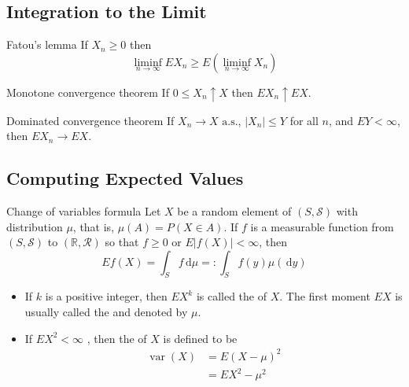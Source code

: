 \documentclass[../main.tex]{subfiles}
\begin{document}
\subsection{Integration to the Limit}
\begin{theorem}{Fatou's lemma}{}
If $X_n \ge 0$ then
\[
\liminf_{n\to\infty} E X_n \ge E\left(\liminf_{n\to\infty} X_n\right)
\]
\end{theorem}

\begin{theorem}{Monotone convergence theorem}{}
If $0 \le X_n \uparrow X$ then $EX_n \uparrow EX$.
\end{theorem}

\begin{theorem}{Dominated convergence theorem}{}
If $X_n \to X \text{ a.s.}$, $|X_n| \le Y$ for all $n$, and $EY < \infty$, then $EX_n \to EX$.
\end{theorem}

\subsection{Computing Expected Values}
\begin{theorem}{Change of variables formula}{}
Let $X$ be a random element of $(S, \mathcal{S})$ with distribution $\mu$, that is, $\mu(A) = P(X \in A)$. If $f$ is a measurable function from $(S, \mathcal{S})$ to $(\mathbb{R}, \mathcal{R})$ so that $f \geq 0$ or $E|f(X)| < \infty$, then
\[ Ef(X) = \int_S f \,\mathrm{d} \mu = : \int_{S}f\left( y \right)\mu \left( \,\mathrm{d} y \right)   \]
\end{theorem}



\begin{definition}{}{}
  \begin{itemize}
    \item If \(  k  \) is a positive integer, then \(  EX^{k}  \) is called the  of \(  X  \). The first moment \(  EX   \) is usually called the  and denoted by \(  \mu   \). 
    \item If \(  EX^{2}< \infty  \) , then the  of \(  X  \) is defined to be \[
    \begin{aligned}
    \operatorname{var}\left( X \right)&=  E\left( X-\mu  \right)^{2}\\ 
     &=    EX^{2}-\mu ^{2}
    \end{aligned}
    \]
  \end{itemize}
  
\end{definition}
\end{document}
